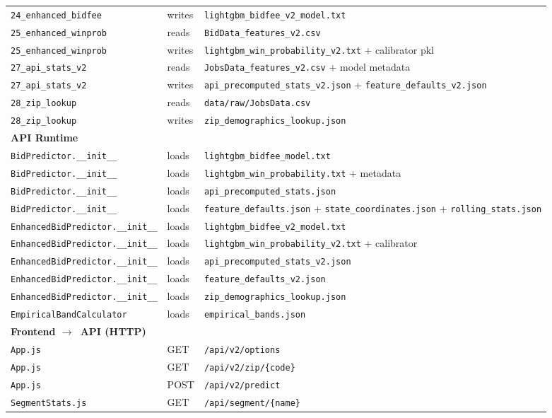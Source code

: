 \documentclass[11pt,a4paper]{article}
\newcommand{\file}[1]{\texttt{\color{gssblue!70!black}#1}}
\newcommand{\arrow}{$\rightarrow$}
\begin{document}
\begin{longtable}{p{5cm} l p{6cm}}
\file{24\_enhanced\_bidfee} & writes & \file{lightgbm\_bidfee\_v2\_model.txt} \\
\file{25\_enhanced\_winprob} & reads & \file{BidData\_features\_v2.csv} \\
\file{25\_enhanced\_winprob} & writes & \file{lightgbm\_win\_probability\_v2.txt} + calibrator pkl \\
\file{27\_api\_stats\_v2} & reads & \file{JobsData\_features\_v2.csv} + model metadata \\
\file{27\_api\_stats\_v2} & writes & \file{api\_precomputed\_stats\_v2.json} + \file{feature\_defaults\_v2.json} \\
\file{28\_zip\_lookup} & reads & \file{data/raw/JobsData.csv} \\
\file{28\_zip\_lookup} & writes & \file{zip\_demographics\_lookup.json} \\
\midrule
\multicolumn{3}{l}{\textbf{API Runtime}} \\
\file{BidPredictor.\_\_init\_\_} & loads & \file{lightgbm\_bidfee\_model.txt} \\
\file{BidPredictor.\_\_init\_\_} & loads & \file{lightgbm\_win\_probability.txt} + metadata \\
\file{BidPredictor.\_\_init\_\_} & loads & \file{api\_precomputed\_stats.json} \\
\file{BidPredictor.\_\_init\_\_} & loads & \file{feature\_defaults.json} + \file{state\_coordinates.json} + \file{rolling\_stats.json} \\
\file{EnhancedBidPredictor.\_\_init\_\_} & loads & \file{lightgbm\_bidfee\_v2\_model.txt} \\
\file{EnhancedBidPredictor.\_\_init\_\_} & loads & \file{lightgbm\_win\_probability\_v2.txt} + calibrator \\
\file{EnhancedBidPredictor.\_\_init\_\_} & loads & \file{api\_precomputed\_stats\_v2.json} \\
\file{EnhancedBidPredictor.\_\_init\_\_} & loads & \file{feature\_defaults\_v2.json} \\
\file{EnhancedBidPredictor.\_\_init\_\_} & loads & \file{zip\_demographics\_lookup.json} \\
\file{EmpiricalBandCalculator} & loads & \file{empirical\_bands.json} \\
\midrule
\multicolumn{3}{l}{\textbf{Frontend \arrow\ API (HTTP)}} \\
\file{App.js} & GET & \texttt{/api/v2/options} \\
\file{App.js} & GET & \texttt{/api/v2/zip/\{code\}} \\
\file{App.js} & POST & \texttt{/api/v2/predict} \\
\file{SegmentStats.js} & GET & \texttt{/api/segment/\{name\}} \\
\bottomrule
\end{longtable}
\end{document}
